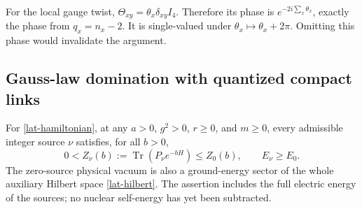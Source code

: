 For the local gauge twist, $\Theta_{xy}=\theta_x\delta_{xy}I_4$.
Therefore its phase is $e^{-2i\sum_x\theta_x}$, exactly the phase
from $q_x=n_x-2$.  It is single-valued under $\theta_x\mapsto
\theta_x+2\pi$.  Omitting this phase would invalidate the argument.

\subsection{Gauss-law domination with quantized compact links}

\begin{theorem}
\label{lat-main}
For \eqref{lat-hamiltonian}, at any $a>0$, $g^2>0$, $r\ge0$, and
$m\ge0$, every admissible integer source $\nu$ satisfies, for all $b>0$,
\begin{equation}
 0<Z_\nu(b):=\operatorname{Tr}(P_\nu e^{-bH})
       \le Z_0(b),\qquad E_\nu\ge E_0.
 \label{lat-vacuum-domination}
\end{equation}
The zero-source physical vacuum is also a ground-energy sector of the
whole auxiliary Hilbert space \eqref{lat-hilbert}.  The assertion includes
the full electric energy of the sources; no nuclear self-energy has yet
been subtracted.
\end{theorem}
